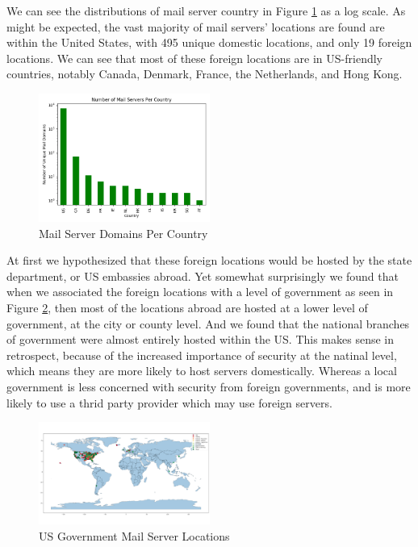 \documentclass{hotnets21}
\begin{document}
We can see the distributions of mail server country in Figure \ref{fig:countrysummary} as a log scale.
As might be expected, the vast majority of mail servers’ locations are found are within the United States, with 495 unique domestic locations, and only 19 foreign locations.
We can see that most of these foreign locations are in US-friendly countries, notably Canada, Denmark, France, the Netherlands, and Hong Kong.

\begin{figure}
\label{fig:countrysummary}
\noindent\includegraphics[width=0.5\textwidth]{Summary/Exchanges Per Country Counts.png}
\caption{Mail Server Domains Per Country}
\end{figure}

At first we hypothesized that these foreign locations would be hosted by the state department, or US embassies abroad.
Yet somewhat surprisingly we found that when we associated the foreign locations with a level of government as seen in Figure \ref{fig:globesummary}, then most of the locations abroad are hosted at a lower level of government, at the city or county level.
And we found that the national branches of government were almost entirely hosted within the US.
This makes sense in retrospect, because of the increased importance of security at the natinal level, which means they are more likely to host servers domestically.
Whereas a local government is less concerned with security from foreign governments, and is more likely to use a thrid party provider which may use foreign servers.

\begin{figure}
\label{fig:globesummary}
\noindent\includegraphics[width=0.5\textwidth]{Summary/Globe.png}
\caption{US Government Mail Server Locations}
\end{figure}
\end{document}
